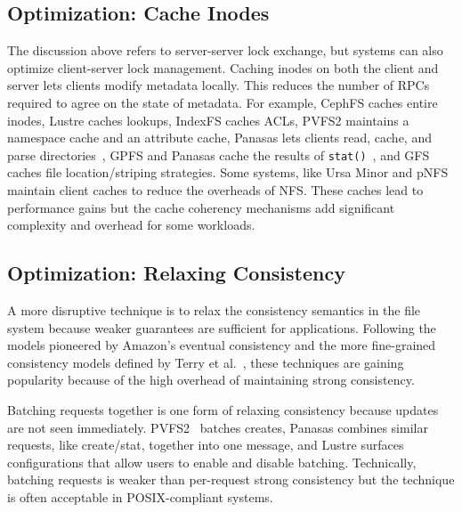 \subsection{Optimization: Cache Inodes}

The discussion above refers to server-server lock exchange, but systems can
also optimize client-server lock management. Caching inodes on both the client
and server lets clients modify metadata locally.  This reduces the number of
RPCs required to agree on the state of metadata.  For example, CephFS caches
entire inodes, Lustre caches lookups, IndexFS caches ACLs, PVFS2 maintains a
namespace cache and an attribute cache, Panasas lets clients read, cache, and
parse directories~\cite{welch:fast08-panasas}, GPFS and Panasas cache the
results of \texttt{stat()}~\cite{docs:cephcaps, schmuck:fast2002-gpfs,
wang:tech09-lustre, depardon:tech13-survey}, and GFS caches file
location/striping strategies.  Some systems, like Ursa Minor and pNFS maintain
client caches to reduce the overheads of NFS. These caches lead to performance
gains but the cache coherency mechanisms add significant complexity and
overhead for some workloads.

\subsection{Optimization: Relaxing Consistency}

A more disruptive technique is to relax the consistency semantics in the file
system because weaker guarantees are sufficient for applications. Following the
models pioneered by Amazon's eventual consistency and the more fine-grained
consistency models defined by Terry et al.~\cite{baseball}, these techniques
are gaining popularity because of the high overhead of maintaining strong
consistency.

Batching requests together is one form of relaxing consistency because updates
are not seen immediately. PVFS2~\cite{PVFS2} batches creates, Panasas combines
similar requests, like create/stat, together into one message, and Lustre
surfaces configurations that allow users to enable and disable batching.
Technically, batching requests is weaker than per-request strong consistency
but the technique is often acceptable in POSIX-compliant systems.

